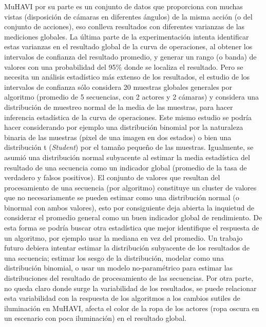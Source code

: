 MuHAVI por su parte es un conjunto de datos que proporciona con muchas vistas (disposición de cámaras en diferentes ángulos) de la misma acción (o del conjunto de acciones), eso conlleva resultados con diferentes varianzas de las mediciones globales. La última parte de la experimentación intenta identificar estas varianzas en el resultado global de la curva de operaciones, al obtener los intervalos de confianza del resultado promedio, y generar un rango (o banda) de valores con una probabilidad del 95\% donde se localiza el resultado. Pero se necesita un análisis estadístico más extenso de los resultados, el estudio de los intervalos de confianza sólo considera 20 muestras globales generales por algoritmo (promedio de 5 secuencias, con 2 actores y 2 cámaras) y considera una distribución de muestreo normal de la media de las muestras, para hacer inferencia estadística de la curva de operaciones. Este mismo estudio se podría hacer considerando por ejemplo una distribución binomial por la naturaleza binaria de las muestras (pixel de una imagen en dos estados) o bien una distribución t (\textit{Student}) por el tamaño pequeño de las muestras. Igualmente, se asumió una distribución normal subyacente al estimar la media estadística del resultado de una secuencia como un indicador global (promedio de la tasa de verdadero y falsos positivos). El conjunto de valores que resultan del procesamiento de una secuencia (por algoritmo) constituye un cluster de valores que no necesariamente se pueden estimar como una distribución normal (o binormal con ambos valores), esto por consiguiente deja abierta la inquietud de considerar el promedio general como un buen indicador global de rendimiento. De esta forma se podría buscar otra estadística que mejor identifique el respuesta de un algoritmo, por ejemplo usar la mediana en vez del promedio. Un trabajo futuro debiera intentar estimar la distribución subyacente de los resultados de una secuencia; estimar los sesgo de la distribución, modelar como una distribución binomial, o usar un modelo no-paramétrico para estimar las distribuciones del resultado de procesamiento de las secuencias. Por otra parte, no queda claro donde surge la variabilidad de los resultados, se puede relacionar esta variabilidad con la respuesta de los algoritmos a los cambios sutiles de iluminación en MuHAVI, afecta el color de la ropa de los actores (ropa oscura en un escenario con poca iluminación) en el resultado global.

